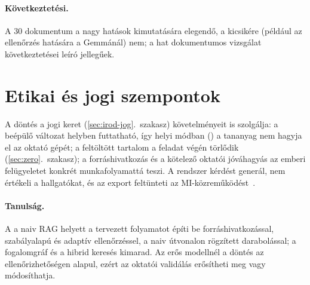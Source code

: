 \paragraph{Következtetési.} A 30 dokumentum a nagy hatások kimutatására elegendő, a kicsikére (például az
ellenőrzés hatására a Gemmánál) nem; a hat dokumentumos vizsgálat következtetései leíró jellegűek.

\section{Etikai és jogi szempontok}

A döntés a jogi keret (\ref{sec:irod-jog}.~szakasz) követelményeit is szolgálja: a beépülő változat helyben
futtatható, így helyi módban () a tananyag nem hagyja el az oktató gépét; a feltöltött
tartalom a feladat végén törlődik (\ref{sec:zero}.~szakasz); a forráshivatkozás és a kötelező oktatói
jóváhagyás az emberi felügyeletet konkrét munkafolyamattá teszi. A rendszer kérdést generál, nem értékeli a
hallgatókat, és az export feltünteti az MI-közreműködést~\cite{aiact2024}.

\paragraph{Tanulság.} A \Mimir{} a naiv RAG helyett a tervezett folyamatot építi be forráshivatkozással,
szabályalapú és adaptív ellenőrzéssel, a naiv útvonalon rögzített darabolással; a fogalomgráf és a hibrid
keresés kimarad. Az erős modellnél a döntés az ellenőrizhetőségen alapul, ezért az oktatói validálás
erősítheti meg vagy módosíthatja.
